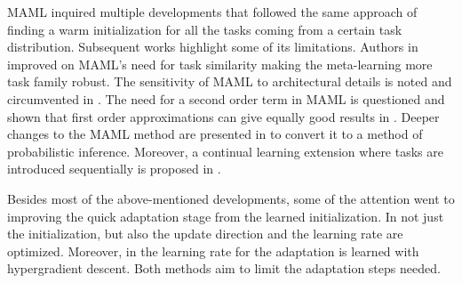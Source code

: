 
MAML inquired multiple developments that followed the same approach of finding a warm initialization for all the tasks coming from a certain task distribution. Subsequent works highlight some of its limitations. Authors in \cite{flennerhag2019,collins2020} improved on MAML's need for task similarity making the meta-learning more task family robust. The sensitivity of MAML to architectural details is noted and circumvented in \cite{antoniou2019}. The need for a second order term in MAML is questioned and shown that first order approximations can give equally good results in \cite{nichol2018}. Deeper changes to the MAML method are presented in \cite{grant2018} to convert it to a method of probabilistic inference. Moreover, a continual learning extension where tasks are introduced sequentially is proposed in \cite{finn2019,rajasegaran2020}. 

Besides most of the above-mentioned developments, some of the attention went to improving the quick adaptation stage from the learned initialization. In \cite{li2017} not just the initialization, but also the update direction and the learning rate are optimized. Moreover, in \cite{behl2019} the learning rate for the adaptation is learned with hypergradient descent. Both methods aim to limit the adaptation steps needed. 

